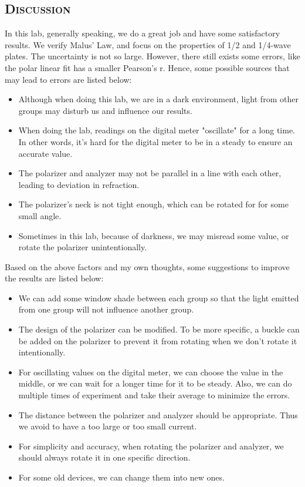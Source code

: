 \documentclass[a4paper,12pt]{article}
\begin{document}
\subsection{\textsc{Discussion}}
In this lab, generally speaking, we do a great job and have some satisfactory results. We verify Malus' Law, and focus on the properties of 1/2 and 1/4-wave plates. The uncertainty is not so large. However, there still exists some errors, like the polar linear fit has a smaller Pearson's r. Hence, some possible sources that may lead to errors are listed below: 
\begin{itemize}
\item Although when doing this lab, we are in a dark environment, light from other groups may disturb us and influence our results.
\item When doing the lab, readings on the digital meter "oscillate" for a long time. In other words, it's hard for the digital meter to be in a steady to ensure an accurate value.
\item The polarizer and analyzer may not be parallel in a line with each other, leading to deviation in refraction.
\item The polarizer's neck is not tight enough, which can be rotated for for some small angle.  
\item Sometimes in this lab, because of darkness, we may misread some value, or rotate the polarizer unintentionally.
\end{itemize}
Based on the above factors and my own thoughts, some suggestions to improve the results are listed below:
\begin{itemize}
\item We can add some window shade between each group so that the light emitted from one group will not influence another group.
\item The design of the polarizer can be modified. To be more specific, a buckle can be added on the polarizer to prevent it from rotating when we don't rotate it intentionally.
\item For oscillating values on the digital meter, we can choose the value in the middle, or we can wait for a longer time for it to be steady. Also, we can do multiple times of experiment and take their average to minimize the errors.
\item The distance between the polarizer and analyzer should be appropriate. Thus we avoid to have a too large or too small current.
\item For simplicity and accuracy, when rotating the polarizer and analyzer, we should always rotate it in one specific direction. 
\item For some old devices, we can change them into new ones.
\end{itemize}
\end{document}
